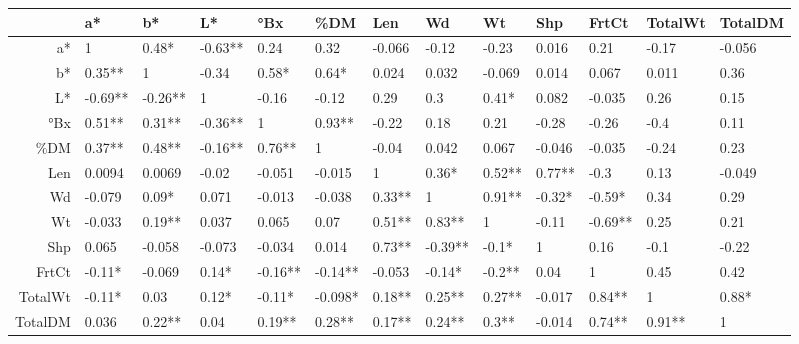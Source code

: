 \begin{table}[ht]
\centering
\begin{tabular}{rllllllllllll}
  \hline
 & a* & b* & L* & °Bx & \%DM & Len & Wd & Wt & Shp & FrtCt & TotalWt & TotalDM \\ 
  \hline
a* & 1 & 0.48* & -0.63** & 0.24 & 0.32 & -0.066 & -0.12 & -0.23 & 0.016 & 0.21 & -0.17 & -0.056 \\ 
  b* & 0.35** & 1 & -0.34 & 0.58* & 0.64* & 0.024 & 0.032 & -0.069 & 0.014 & 0.067 & 0.011 & 0.36 \\ 
  L* & -0.69** & -0.26** & 1 & -0.16 & -0.12 & 0.29 & 0.3 & 0.41* & 0.082 & -0.035 & 0.26 & 0.15 \\ 
  °Bx & 0.51** & 0.31** & -0.36** & 1 & 0.93** & -0.22 & 0.18 & 0.21 & -0.28 & -0.26 & -0.4 & 0.11 \\ 
  \%DM & 0.37** & 0.48** & -0.16** & 0.76** & 1 & -0.04 & 0.042 & 0.067 & -0.046 & -0.035 & -0.24 & 0.23 \\ 
  Len & 0.0094 & 0.0069 & -0.02 & -0.051 & -0.015 & 1 & 0.36* & 0.52** & 0.77** & -0.3 & 0.13 & -0.049 \\ 
  Wd & -0.079 & 0.09* & 0.071 & -0.013 & -0.038 & 0.33** & 1 & 0.91** & -0.32* & -0.59* & 0.34 & 0.29 \\ 
  Wt & -0.033 & 0.19** & 0.037 & 0.065 & 0.07 & 0.51** & 0.83** & 1 & -0.11 & -0.69** & 0.25 & 0.21 \\ 
  Shp & 0.065 & -0.058 & -0.073 & -0.034 & 0.014 & 0.73** & -0.39** & -0.1* & 1 & 0.16 & -0.1 & -0.22 \\ 
  FrtCt & -0.11* & -0.069 & 0.14* & -0.16** & -0.14** & -0.053 & -0.14* & -0.2** & 0.04 & 1 & 0.45 & 0.42 \\ 
  TotalWt & -0.11* & 0.03 & 0.12* & -0.11* & -0.098* & 0.18** & 0.25** & 0.27** & -0.017 & 0.84** & 1 & 0.88* \\ 
  TotalDM & 0.036 & 0.22** & 0.04 & 0.19** & 0.28** & 0.17** & 0.24** & 0.3** & -0.014 & 0.74** & 0.91** & 1 \\ 
   \hline
\end{tabular}
\end{table}
